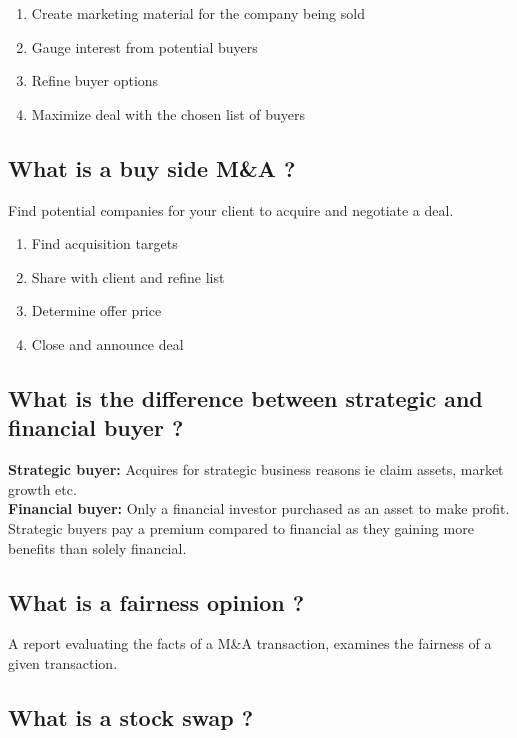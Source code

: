 \documentclass[11pt]{scrartcl} %
\begin{document}
\begin{enumerate}
	\item Create marketing material for the company being sold
	\item Gauge interest from potential buyers
	\item Refine buyer options
	\item Maximize deal with the chosen list of buyers 
\end{enumerate}

\subsection{What is a buy side M\&A ?}

Find potential companies for your client to acquire and negotiate a deal.

\begin{enumerate}
	\item Find acquisition targets
	\item Share with client and refine list
	\item Determine offer price
	\item Close and announce deal
\end{enumerate}

\subsection{What is the difference between strategic and financial buyer ?}

\textbf{Strategic buyer:} Acquires for strategic business reasons ie claim assets, market growth etc.\\
\textbf{Financial buyer:} Only a financial investor purchased as an asset to make profit.\\

Strategic buyers pay a premium compared to financial as they gaining more benefits than solely financial.

\subsection{What is a fairness opinion ?}

A report evaluating the facts of a M\&A transaction, examines the fairness of a given transaction.

\subsection{What is a stock swap ?}
\end{document}
